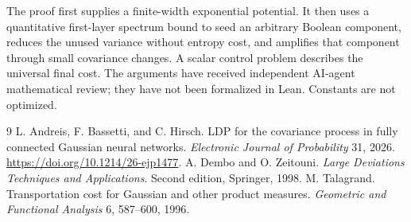 \documentclass[11pt]{article}
\begin{document}
The proof first supplies a finite-width exponential potential. It then
uses a quantitative first-layer spectrum bound to seed an arbitrary
Boolean component, reduces the unused variance without entropy cost,
and amplifies that component through small covariance changes. A scalar
control problem describes the universal final cost. The arguments have
received independent AI-agent mathematical review; they have not been
formalized in Lean. Constants are not optimized.




















\appendix


\begin{thebibliography}{9}
L. Andreis, F. Bassetti, and C. Hirsch.
LDP for the covariance process in fully connected Gaussian neural networks.
\emph{Electronic Journal of Probability} 31, 2026.
\url{https://doi.org/10.1214/26-ejp1477}.
A. Dembo and O. Zeitouni.
\emph{Large Deviations Techniques and Applications}. Second edition,
Springer, 1998.
M. Talagrand.
Transportation cost for Gaussian and other product measures.
\emph{Geometric and Functional Analysis} 6, 587--600, 1996.
\end{thebibliography}
\end{document}
